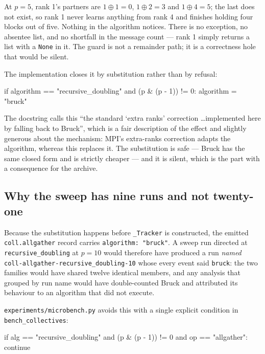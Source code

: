 \documentclass[11pt]{article}
\begin{document}
\noindent
At $p=5$, rank 1's partners are $1 \oplus 1 = 0$, $1 \oplus 2 = 3$ and $1 \oplus 4 = 5$; the last
does not exist, so rank 1 never learns anything from rank 4 and finishes holding four blocks out
of five. Nothing in the algorithm notices. There is no exception, no absentee list, and no
shortfall in the message count --- rank 1 simply returns a list with a \texttt{None} in it. The
guard is not a remainder path; it is a correctness hole that would be silent.

The implementation closes it by substitution rather than by refusal:

\begin{center}\ttfamily\small
if algorithm == "recursive\_doubling" and (p \& (p - 1)) != 0: algorithm = "bruck"
\end{center}

\noindent
The docstring calls this ``the standard `extra ranks' correction \ldots implemented here by falling
back to Bruck'', which is a fair description of the effect and slightly generous about the
mechanism: MPI's extra-ranks correction adapts the algorithm, whereas this replaces it. The
substitution is safe --- Bruck has the same closed form and is strictly cheaper --- and it is
silent, which is the part with a consequence for the archive.

\subsection{Why the sweep has nine runs and not twenty-one}

Because the substitution happens before \texttt{\_Tracker} is constructed, the emitted
\texttt{coll.allgather} record carries \texttt{algorithm: "bruck"}. A sweep run directed at
\texttt{recursive\_doubling} at $p=10$ would therefore have produced a run \emph{named}
\texttt{coll-allgather-recursive\_doubling-10} whose every event said \texttt{bruck}: the two
families would have shared twelve identical members, and any analysis that grouped by run name
would have double-counted Bruck and attributed its behaviour to an algorithm that did not execute.

\texttt{experiments/microbench.py} avoids this with a single explicit condition in
\texttt{bench\_collectives}:

\begin{center}\ttfamily\small
if alg == "recursive\_doubling" and (p \& (p - 1)) != 0 and op == "allgather": continue
\end{center}
\end{document}
